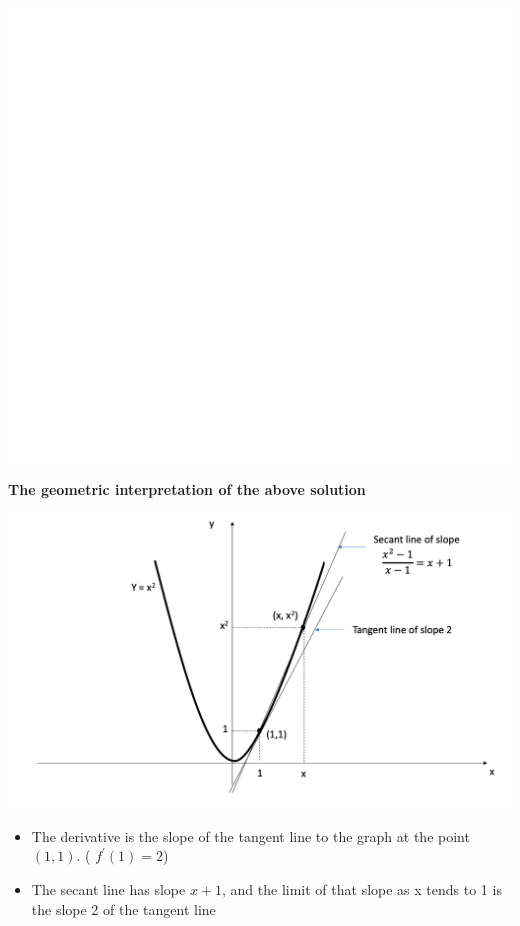 \documentclass[]{book}
\providecommand{\tightlist}{%
  \setlength{\itemsep}{0pt}\setlength{\parskip}{0pt}}
\begin{document}
\begin{center}\includegraphics[width=1\linewidth]{figure/Devbox1a-1} \end{center}

\newpage

\textbf{The geometric interpretation of the above solution}

\begin{center}\includegraphics[width=1\linewidth]{figure/5Derivatives-4} \end{center}

\begin{itemize}
\tightlist
\item
  The derivative is the slope of the tangent line to the graph at the point \((1,1)\). ( \(f^\prime(1) = 2\))
\item
  The secant line has slope \(x+1\), and the limit of that slope as x tends to 1 is the slope 2 of the tangent line
\end{itemize}
\end{document}

